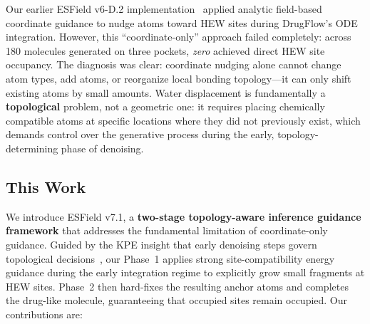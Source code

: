 \documentclass[11pt,letterpaper]{article}
\begin{document}
Our earlier ESField v6-D.2 implementation~\cite{esfield2026} applied analytic
field-based coordinate guidance to nudge atoms toward HEW sites during
DrugFlow's ODE integration.  However, this ``coordinate-only'' approach failed
completely: across 180 molecules generated on three pockets, \emph{zero}
achieved direct HEW site occupancy.  The diagnosis was clear: coordinate nudging
alone cannot change atom types, add atoms, or reorganize local bonding
topology---it can only shift existing atoms by small amounts.  Water
displacement is fundamentally a \textbf{topological} problem, not a geometric
one: it requires placing chemically compatible atoms at specific locations where
they did not previously exist, which demands control over the generative process
during the early, topology-determining phase of denoising.

\subsection{This Work}

We introduce ESField v7.1, a \textbf{two-stage topology-aware inference guidance
framework} that addresses the fundamental limitation of coordinate-only
guidance.  Guided by the KPE insight that early denoising steps govern
topological decisions~\cite{li2026kpe}, our Phase~1 applies strong
site-compatibility energy guidance during the early integration regime to
explicitly grow small fragments at HEW sites.  Phase~2 then hard-fixes the
resulting anchor atoms and completes the drug-like molecule, guaranteeing that
occupied sites remain occupied.  Our contributions are:
\end{document}
